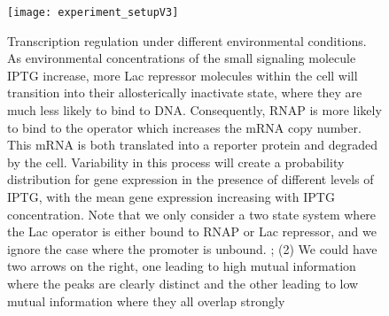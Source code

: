 \begin{figure}[h!]
	\centering \texttt{[image: experiment\_setupV3]} \caption{Transcription
		regulation under different environmental conditions. As environmental
		concentrations of the small signaling molecule IPTG increase, more Lac
		repressor molecules within the cell will transition into their allosterically
		inactivate state, where they are much less likely to bind to DNA. Consequently,
		RNAP is more likely to bind to the operator which increases the mRNA copy
		number. This mRNA is both translated into a reporter protein and degraded by
		the cell. Variability in this process will create a probability distribution
		for gene expression in the presence of different levels of IPTG, with the mean
		gene expression increasing with IPTG concentration. Note that we only consider
		a two state system where the Lac operator is either bound to RNAP or Lac
		repressor, and we ignore the case where the promoter is unbound. ; (2) We could have two arrows on the right, one leading to high mutual information where the peaks are clearly distinct and the other leading to low mutual information where they all overlap strongly}
	\label{figExpSetup}
\end{figure}

